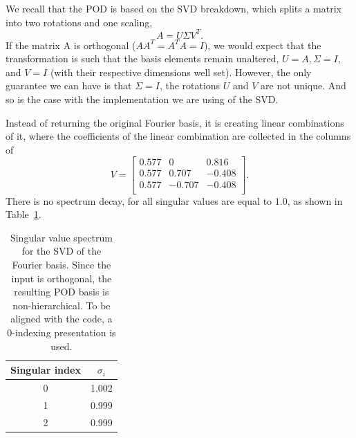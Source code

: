 \documentclass[../../thesis.tex]{subfiles}
\begin{document}
We recall that the POD is based on the SVD breakdown, which splits a matrix into 
two rotations and one scaling,
\begin{equation}
    A = U \Sigma V^T.
\end{equation}
If the matrix A is orthogonal ($AA^T = A^T A = I$),
we would expect that the transformation is such that the basis elements
remain unaltered,
$U=A, \Sigma = I,$ and $V=I$ 
(with their respective dimensions well set).
However, the only guarantee we can have is that $\Sigma = I$,
the rotations $U$ and $V$ are not unique.
And so is the case with the implementation we are using of the SVD.

Instead of returning the original Fourier basis, 
it is creating linear combinations of it, 
where the coefficients of the linear combination are collected in the columns of
\begin{equation}
    V = \begin{bmatrix}
        0.577 &  0     &  0.816 \\
        0.577 &  0.707 & -0.408 \\
        0.577 & -0.707 & -0.408 \\
    \end{bmatrix}.
\end{equation}
There is no spectrum decay, for all singular values are equal to $1.0$,
as shown in Table~\ref{tab:appendix_fourier_spectrum}.
\begin{table}[h]
    \centering
    \caption{Singular value spectrum for the SVD of the Fourier basis.
    Since the input is orthogonal, the resulting POD basis is non-hierarchical.
    To be aligned with the code, a 0-indexing presentation is used.}
    \begin{tabular}{cc}
        \toprule
        Singular index & $\sigma_i$ \\
        \midrule
        0 &  1.002 \\
        1 &  0.999 \\
        2 &  0.999 \\
        \bottomrule
    \end{tabular}
    \label{tab:appendix_fourier_spectrum}
\end{table}
\end{document}
